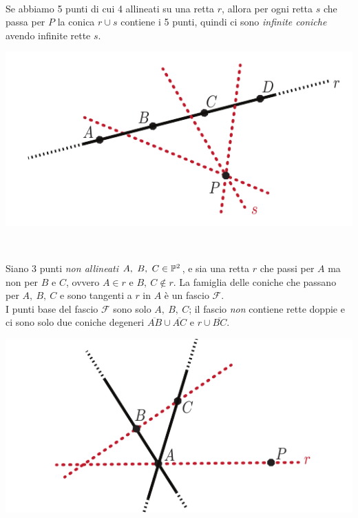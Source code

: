 \begin{example}~{}\\
		\begin{minipage}{0.69\textwidth}
	Se abbiamo 5 punti di cui 4 allineati su una retta $r$, allora per ogni retta $s$ che passa per $P$ la conica $r\cup s$ contiene i 5 punti, quindi ci sono \textit{infinite coniche} avendo infinite rette $s$.
	\end{minipage}
	\begin{minipage}{0.3\textwidth}
		\includegraphics[trim=0cm 0cm 0cm 0cm,clip,scale=0.50]{images/fourpointconic.pdf}
	\end{minipage}
\end{example}
\begin{proposition}~{}\\
	\begin{minipage}{0.72\textwidth}
	Siano 3 punti \textit{non allineati} $A,\ B,\ C\in\proj[2]{\ }$, e sia una retta $r$ che passi per $A$ ma non per $B$ e $C$, ovvero $A\in r$ e $B,\ C\notin r$. La famiglia delle coniche che passano per $A,\ B,\ C$ e sono tangenti a $r$ in $A$ è un fascio $\mathcal{F}$.\\
	I punti base del fascio $\mathcal{F}$ sono solo $A,\ B,\ C$; il fascio \textit{non} contiene rette doppie e ci sono solo due coniche degeneri $\overline{AB}\cup\overline{AC}$ e $r\cup\overline{BC}$.
	\end{minipage}
	\hspace{-2mm}
	\begin{minipage}{0.27\textwidth}
		\includegraphics[trim=0cm 0cm 0cm 0cm,clip,scale=0.50]{images/fourpointconic2.pdf}
	\end{minipage}
\end{proposition}
